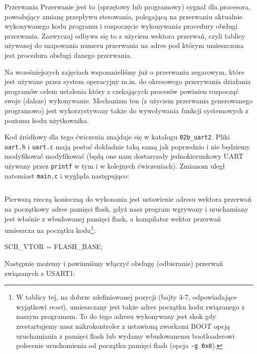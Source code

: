 \documentclass{pdfBooklets}
\begin{document}
\begin{ProTip}{Przerwania}
  Przerwanie jest to (sprzętowy lub programowy) sygnał dla procesora, powodujący zmianę przepływu sterowania, polegającą na przerwaniu aktualnie wykonywanego kodu programu i rozpoczęcie wykonywania procedury obsługi przerwania.
  Zazwyczaj odbywa się to z użyciem wektora przerwań, czyli tablicy używanej do mapowania numeru przerwania na adres pod którym umieszczona jest procedura obsługi danego przerwania.
  
  Na wcześniejszych zajęciach wspomnieliśmy już o przerwaniu zegarowym, które jest używane przez system operacyjny m.in. do okresowego przerywania działania programów celem ustalenia który z czekających procesów powinien rozpocząć swoje (dalsze) wykonywanie.
  Mechanizm ten (z użyciem przerwania generowanego programowo) jest wykorzystywany także do wywoływania funkcji systemowych z poziomu kodu użytkownika.
\end{ProTip}

Kod źródłowy dla tego ćwiczenia znajduje się w katalogu \Verb$02b_uart2$. Pliki \Verb$uart.h$ i \Verb$uart.c$ mają postać dokładnie taką samą jak poprzednio i nie będziemy modyfikować modyfikować (będą one nam dostarczały jednokierunkowy UART używany przez \Verb$printf$ w tym i w kolejnych ćwiczeniach). Zmianom uległ natomiast \Verb$main.c$ i wygląda następująco:

\inputminted[frame=single,firstline=6]{c}{stm32-examples/02b_uart2/main.c}

Pierwszą rzeczą konieczną do wykonania jest ustawienie adresu wektora przerwań na początkowy adres pamięci flash,
	gdyż nasz program wgrywany i uruchamiany jest właśnie z wbudowanej pamięci flash,
	a kompilator wektor przerwań umieszcza na początku kodu\footnote{
		W tablicy tej, na dobrze zdefiniowanej pozycji (bajty 4-7, odpowiadające wyjątkowi \textit{reset}), umieszczany jest także adres początku kodu związanego z naszym programem.
		To do tego adresu wykonywany jest skok gdy zrestartujemy nasz mikrokontroler z ustawioną zworkami BOOT opcją uruchamiania z pamięci flash
			lub wydamy wbudowanemu bootloaderowi polecenie uruchomienia od początku pamięci flash (opcja \Verb$-g 0x0$).
	}:
	
\begin{CodeFrame*}[c]{}
  SCB_VTOR = FLASH_BASE;
\end{CodeFrame*}

Następnie możemy i powinniśmy włączyć obsługę (odbieranie) przerwań związanych z USART1:
\end{document}
